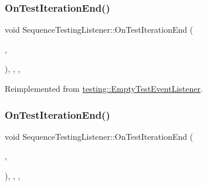 \mbox{\label{class_sequence_testing_listener_ae3a4e15e6c811a7b70992669d659e11e}} 
\subsubsection{\texorpdfstring{OnTestIterationEnd()}{OnTestIterationEnd()}\hspace{0.1cm}{\footnotesize\ttfamily [1/3]}}
{\footnotesize\ttfamily void Sequence\+Testing\+Listener\+::\+On\+Test\+Iteration\+End (\begin{DoxyParamCaption}\item[{const \mbox{\hyperlink{classtesting_1_1_unit_test}{Unit\+Test}} \&}]{,  }\item[{int}]{ }\end{DoxyParamCaption})\hspace{0.3cm}{\ttfamily [inline]}, {\ttfamily [override]}, {\ttfamily [protected]}, {\ttfamily [virtual]}}



Reimplemented from \mbox{\hyperlink{classtesting_1_1_empty_test_event_listener_aae9c5c61e476f0c421402fb1dde434d2}{testing\+::\+Empty\+Test\+Event\+Listener}}.

\mbox{\label{class_sequence_testing_listener_ae3a4e15e6c811a7b70992669d659e11e}} 
\subsubsection{\texorpdfstring{OnTestIterationEnd()}{OnTestIterationEnd()}\hspace{0.1cm}{\footnotesize\ttfamily [2/3]}}
{\footnotesize\ttfamily void Sequence\+Testing\+Listener\+::\+On\+Test\+Iteration\+End (\begin{DoxyParamCaption}\item[{const \mbox{\hyperlink{classtesting_1_1_unit_test}{Unit\+Test}} \&}]{,  }\item[{int}]{ }\end{DoxyParamCaption})\hspace{0.3cm}{\ttfamily [inline]}, {\ttfamily [override]}, {\ttfamily [protected]}, {\ttfamily [virtual]}}



